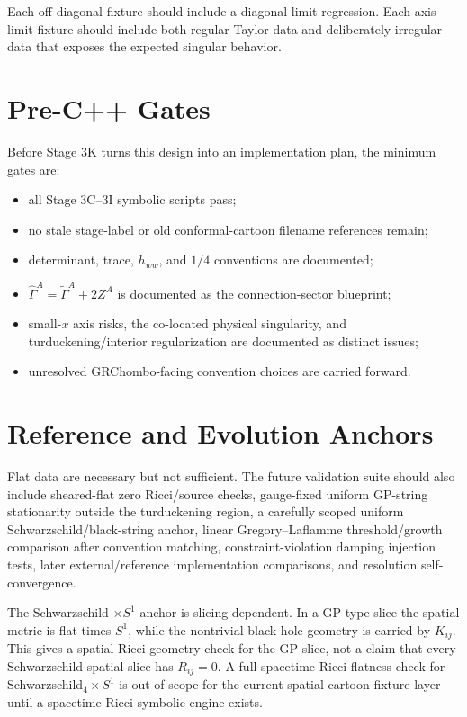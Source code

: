 \documentclass[11pt]{article}
\begin{document}
Each off-diagonal fixture should include a diagonal-limit regression. Each
axis-limit fixture should include both regular Taylor data and deliberately
irregular data that exposes the expected singular behavior.

\section{Pre-C++ Gates}

Before Stage 3K turns this design into an implementation plan, the minimum
gates are:

\begin{itemize}[leftmargin=2em]
\item all Stage 3C--3I symbolic scripts pass;
\item no stale stage-label or old conformal-cartoon filename references remain;
\item determinant, trace, \(h_{ww}\), and \(1/4\) conventions are documented;
\item \(\hat{\Gamma}^{A}=\tilde{\Gamma}^{A}+2Z^{A}\) is documented as the
  connection-sector blueprint;
\item small-\(x\) axis risks, the co-located physical singularity, and
  turduckening/interior regularization are documented as distinct issues;
\item unresolved GRChombo-facing convention choices are carried forward.
\end{itemize}

\section{Reference and Evolution Anchors}

Flat data are necessary but not sufficient. The future validation suite should
also include sheared-flat zero Ricci/source checks, gauge-fixed uniform
GP-string stationarity outside the turduckening region, a carefully scoped
uniform Schwarzschild/black-string anchor, linear Gregory--Laflamme
threshold/growth comparison after convention matching, constraint-violation
damping injection tests, later external/reference implementation comparisons,
and resolution self-convergence.

The Schwarzschild \(\times S^1\) anchor is slicing-dependent. In a GP-type
slice the spatial metric is flat times \(S^1\), while the nontrivial
black-hole geometry is carried by \(K_{ij}\). This gives a spatial-Ricci
geometry check for the GP slice, not a claim that every Schwarzschild spatial
slice has \(R_{ij}=0\). A full spacetime Ricci-flatness check for
Schwarzschild\(_4\times S^1\) is out of scope for the current spatial-cartoon
fixture layer until a spacetime-Ricci symbolic engine exists.
\end{document}

